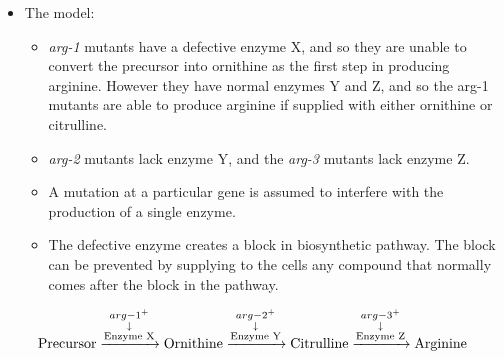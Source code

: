 \documentclass[11pt,dvipsnames,ignorenonframetext,aspectratio=169]{beamer}
\providecommand{\tightlist}{%
  \setlength{\itemsep}{0pt}\setlength{\parskip}{0pt}}
\begin{document}
\begin{frame}{}
\protect\hypertarget{section-8}{}

\begin{itemize}
\tightlist
\item
  The model:

  \begin{itemize}
  \tightlist
  \item
    \emph{arg-1} mutants have a defective enzyme X, and so they are
    unable to convert the precursor into ornithine as the first step in
    producing arginine. However they have normal enzymes Y and Z, and so
    the arg-1 mutants are able to produce arginine if supplied with
    either ornithine or citrulline.
  \item
    \emph{arg-2} mutants lack enzyme Y, and the \emph{arg-3} mutants
    lack enzyme Z.
  \item
    A mutation at a particular gene is assumed to interfere with the
    production of a single enzyme.
  \item
    The defective enzyme creates a block in biosynthetic pathway. The
    block can be prevented by supplying to the cells any compound that
    normally comes after the block in the pathway.
  \end{itemize}
\end{itemize}

\[
 \text{Precursor} \xrightarrow 
 {
 \begin{subarray}{c}
 arg-1^+ \\
 \downarrow \\
 \text{Enzyme X}
 \end{subarray}
 } 
 \text{Ornithine} \xrightarrow
  {
 \begin{subarray}{c}
  arg-2^+ \\
 \downarrow \\
 \text{Enzyme Y}
 \end{subarray}
 }
 \text{Citrulline} \xrightarrow
  {
 \begin{subarray}{c}
  arg-3^+ \\
 \downarrow \\
 \text{Enzyme Z}
 \end{subarray}
 }
 \text{Arginine}
\]

\end{frame}
\end{document}

